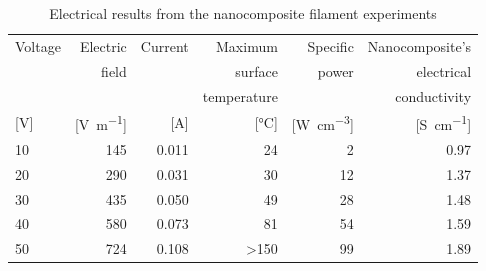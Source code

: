 \documentclass[11pt,review,times]{elsarticle}
\begin{document}
\begin{table}[h]
\centering
\begin{tabular}{@{}lrrrrr@{}}
\toprule
Voltage 			& Electric					& Current 			& Maximum  					& Specific   						& Nanocomposite's \\ 
 					& field						&  						& surface 					& power   							& electrical \\ 
 					& 								&  						& temperature 				&    									& conductivity \\
{[}\si{\V}{]} 	& {[}\si{\V\per\m}{]} 	& {[}\si{\A}{]} 	& {[}\si{\celsius}{]} 	& {[}\si{\W\per\cubic\cm}{]}	& {[}\si{\siemens\per\cm}{]} \\ \midrule
10 					& 145							& 0.011 				& 24 							& 2		  								& 0.97 \\
20					& 290							& 0.031 				& 30 							& 12	 								& 1.37 \\
30 					& 435							& 0.050 				& 49 							& 28	 								& 1.48 \\
40 					& 580							& 0.073 				& 81 							& 54	 								& 1.59 \\
50 					& 724							& 0.108 				& \textgreater 150 		& 99	 								& 1.89 \\ \bottomrule
\end{tabular}%
\caption{Electrical results from the nanocomposite filament experiments}
\label{tab:results_lab}
\end{table}

\begin{table}[H]
\centering
{}
\caption{ASS and fractography analysis reported as average values $\pm$ standard deviation}
\label{tab:SLS_and_fractography_results}
\end{table}
\end{document}
